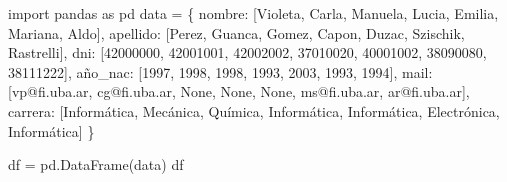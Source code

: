 \documentclass[
  letterpaper,
  DIV=11,
  numbers=noendperiod]{scrreprt}
\newenvironment{Shaded}{\begin{snugshade}}{\end{snugshade}}
\newcommand{\DecValTok}[1]{\textcolor[rgb]{0.68,0.00,0.00}{#1}}
\newcommand{\ImportTok}[1]{\textcolor[rgb]{0.00,0.46,0.62}{#1}}
\newcommand{\NormalTok}[1]{\textcolor[rgb]{0.00,0.23,0.31}{#1}}
\newcommand{\OperatorTok}[1]{\textcolor[rgb]{0.37,0.37,0.37}{#1}}
\newcommand{\StringTok}[1]{\textcolor[rgb]{0.13,0.47,0.30}{#1}}
\newcommand{\VariableTok}[1]{\textcolor[rgb]{0.07,0.07,0.07}{#1}}
\begin{document}
\begin{Shaded}
\begin{Highlighting}[]
\ImportTok{import}\NormalTok{ pandas }\ImportTok{as}\NormalTok{ pd}
\NormalTok{data }\OperatorTok{=}\NormalTok{ \{}
    \StringTok{\textquotesingle{}nombre\textquotesingle{}}\NormalTok{: [}\StringTok{\textquotesingle{}Violeta\textquotesingle{}}\NormalTok{, }\StringTok{\textquotesingle{}Carla\textquotesingle{}}\NormalTok{, }\StringTok{\textquotesingle{}Manuela\textquotesingle{}}\NormalTok{, }\StringTok{\textquotesingle{}Lucia\textquotesingle{}}\NormalTok{, }\StringTok{\textquotesingle{}Emilia\textquotesingle{}}\NormalTok{, }\StringTok{\textquotesingle{}Mariana\textquotesingle{}}\NormalTok{, }\StringTok{\textquotesingle{}Aldo\textquotesingle{}}\NormalTok{],}
    \StringTok{\textquotesingle{}apellido\textquotesingle{}}\NormalTok{: [}\StringTok{\textquotesingle{}Perez\textquotesingle{}}\NormalTok{, }\StringTok{\textquotesingle{}Guanca\textquotesingle{}}\NormalTok{, }\StringTok{\textquotesingle{}Gomez\textquotesingle{}}\NormalTok{, }\StringTok{\textquotesingle{}Capon\textquotesingle{}}\NormalTok{, }\StringTok{\textquotesingle{}Duzac\textquotesingle{}}\NormalTok{, }\StringTok{\textquotesingle{}Szischik\textquotesingle{}}\NormalTok{, }\StringTok{\textquotesingle{}Rastrelli\textquotesingle{}}\NormalTok{],}
    \StringTok{\textquotesingle{}dni\textquotesingle{}}\NormalTok{: [}\DecValTok{42000000}\NormalTok{, }\DecValTok{42001001}\NormalTok{, }\DecValTok{42002002}\NormalTok{, }\DecValTok{37010020}\NormalTok{, }\DecValTok{40001002}\NormalTok{, }\DecValTok{38090080}\NormalTok{, }\DecValTok{38111222}\NormalTok{],}
    \StringTok{\textquotesingle{}año\_nac\textquotesingle{}}\NormalTok{: [}\DecValTok{1997}\NormalTok{, }\DecValTok{1998}\NormalTok{, }\DecValTok{1998}\NormalTok{, }\DecValTok{1993}\NormalTok{, }\DecValTok{2003}\NormalTok{, }\DecValTok{1993}\NormalTok{, }\DecValTok{1994}\NormalTok{],}
    \StringTok{\textquotesingle{}mail\textquotesingle{}}\NormalTok{: [}\StringTok{\textquotesingle{}vp@fi.uba.ar\textquotesingle{}}\NormalTok{, }\StringTok{\textquotesingle{}cg@fi.uba.ar\textquotesingle{}}\NormalTok{, }\VariableTok{None}\NormalTok{, }\VariableTok{None}\NormalTok{, }\VariableTok{None}\NormalTok{, }\StringTok{\textquotesingle{}ms@fi.uba.ar\textquotesingle{}}\NormalTok{, }\StringTok{\textquotesingle{}ar@fi.uba.ar\textquotesingle{}}\NormalTok{],}
    \StringTok{\textquotesingle{}carrera\textquotesingle{}}\NormalTok{: [}\StringTok{\textquotesingle{}Informática\textquotesingle{}}\NormalTok{, }\StringTok{\textquotesingle{}Mecánica\textquotesingle{}}\NormalTok{, }\StringTok{\textquotesingle{}Química\textquotesingle{}}\NormalTok{, }\StringTok{\textquotesingle{}Informática\textquotesingle{}}\NormalTok{, }\StringTok{\textquotesingle{}Informática\textquotesingle{}}\NormalTok{, }\StringTok{\textquotesingle{}Electrónica\textquotesingle{}}\NormalTok{, }\StringTok{\textquotesingle{}Informática\textquotesingle{}}\NormalTok{]}
\NormalTok{\}}

\NormalTok{df }\OperatorTok{=}\NormalTok{ pd.DataFrame(data)}
\NormalTok{df}
\end{Highlighting}
\end{Shaded}
\end{document}
